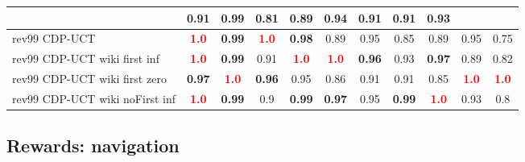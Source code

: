 \documentclass{article}
\begin{document}
\begin{tabular}{|l|r@{$\pm$}rr@{$\pm$}rr@{$\pm$}rr@{$\pm$}rr@{$\pm$}rr@{$\pm$}rr@{$\pm$}rr@{$\pm$}rr@{$\pm$}rr@{$\pm$}r|}
& \multicolumn{2}{c}{0.91}
& \multicolumn{2}{c}{0.99}
& \multicolumn{2}{c}{0.81}
& \multicolumn{2}{c}{0.89}
& \multicolumn{2}{c}{0.94}
& \multicolumn{2}{c}{0.91}
& \multicolumn{2}{c}{0.91}
& \multicolumn{2}{c|}{0.93}
\\
\hline
rev99 CDP-UCT
& \multicolumn{2}{c}{\textbf{\textcolor{red}{1.0}}}
& \multicolumn{2}{c}{\textbf{0.99}}
& \multicolumn{2}{c}{\textbf{\textcolor{red}{1.0}}}
& \multicolumn{2}{c}{\textbf{0.98}}
& \multicolumn{2}{c}{0.89}
& \multicolumn{2}{c}{0.95}
& \multicolumn{2}{c}{0.85}
& \multicolumn{2}{c}{0.89}
& \multicolumn{2}{c}{0.95}
& \multicolumn{2}{c|}{0.75}
\\
rev99 CDP-UCT wiki first inf
& \multicolumn{2}{c}{\textbf{\textcolor{red}{1.0}}}
& \multicolumn{2}{c}{\textbf{0.99}}
& \multicolumn{2}{c}{0.91}
& \multicolumn{2}{c}{\textbf{\textcolor{red}{1.0}}}
& \multicolumn{2}{c}{\textbf{\textcolor{red}{1.0}}}
& \multicolumn{2}{c}{\textbf{0.96}}
& \multicolumn{2}{c}{0.93}
& \multicolumn{2}{c}{\textbf{0.97}}
& \multicolumn{2}{c}{0.89}
& \multicolumn{2}{c|}{0.82}
\\
rev99 CDP-UCT wiki first zero
& \multicolumn{2}{c}{\textbf{0.97}}
& \multicolumn{2}{c}{\textbf{\textcolor{red}{1.0}}}
& \multicolumn{2}{c}{\textbf{0.96}}
& \multicolumn{2}{c}{0.95}
& \multicolumn{2}{c}{0.86}
& \multicolumn{2}{c}{0.91}
& \multicolumn{2}{c}{0.91}
& \multicolumn{2}{c}{0.85}
& \multicolumn{2}{c}{\textbf{\textcolor{red}{1.0}}}
& \multicolumn{2}{c|}{\textbf{\textcolor{red}{1.0}}}
\\
rev99 CDP-UCT wiki noFirst inf
& \multicolumn{2}{c}{\textbf{\textcolor{red}{1.0}}}
& \multicolumn{2}{c}{\textbf{0.99}}
& \multicolumn{2}{c}{0.9}
& \multicolumn{2}{c}{\textbf{0.99}}
& \multicolumn{2}{c}{\textbf{0.97}}
& \multicolumn{2}{c}{0.95}
& \multicolumn{2}{c}{\textbf{0.99}}
& \multicolumn{2}{c}{\textbf{\textcolor{red}{1.0}}}
& \multicolumn{2}{c}{0.93}
& \multicolumn{2}{c|}{0.8}
\\
\hline
\end{tabular}%

\bigskip

\subsection*{Rewards: navigation}
\end{document}
